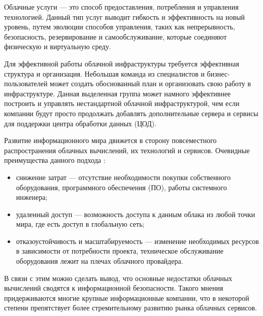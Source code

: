 
Облачные услуги --- это способ предоставления, потребления и управления технологией.
Данный тип услуг выводит гибкость и эффективность на новый уровень, путем эволюции способов управления, таких как непрерывность, безопасность, резервирование и самообслуживание, которые соединяют физическую и виртуальную среду.

Для эффективной работы облачной инфраструктуры требуется эффективная структура и организация.
Небольшая команда из специалистов и бизнес-пользователей может создать обоснованный план и организовать свою работу в инфраструктуре.
Данная выделенная группа может намного эффективнее построить и управлять нестандартной облачной инфраструктурой, чем если компании будут просто продолжать добавлять дополнительные сервера и сервисы для поддержки центра обработки данных (ЦОД).

Развитие информационного мира движется в сторону повсеместного распространения облачных вычислений, их технологий и сервисов.
Очевидные преимущества данного подхода \cite{telecom-world}:
\begin{itemize}
  \item снижение затрат --- отсутствие необходимости покупки собственного оборудования, программного обеспечения (ПО), работы системного инженера;
  \item удаленный доступ --- возможность доступа к данным облака из любой точки мира, где есть доступ в глобальную сеть;
  \item отказоустойчивость и масштабируемость --- изменение необходимых ресурсов в зависимости от потребности проекта, техническое обслуживание оборудования лежит на плечах облачного провайдера.
\end{itemize}

В связи с этим можно сделать вывод, что основные недостатки облачных вычислений сводятся к информационной безопасности.
Такого мнения придерживаются многие крупные информационные компании, что в некоторой степени препятствует более стремительному развитию рынка облачных сервисов.

\clearpage
